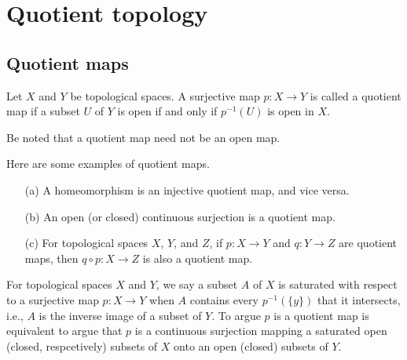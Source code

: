 \section{Quotient topology}

\subsection{Quotient maps}

\begin{defi}
    Let $X$ and $Y$ be topological spaces.
    A surjective map $p: X\rightarrow Y$ is called a quotient map if a subset $U$ of $Y$ is open if and only if $p^{-1}(U)$ is open in $X$.
\end{defi}
\begin{rmk}
    Be noted that a quotient map need not be an open map.
\end{rmk}
\begin{exmp}
    Here are some examples of quotient maps.
    \begin{enumerate}
        \item[(a)]
        {
            A homeomorphism is an injective quotient map, and vice versa.
        }
        \item[(b)]
        {
            An open (or closed) continuous surjection is a quotient map.
        }
        \item[(c)]
        {
            For topological spaces $X$, $Y$, and $Z$, if $p: X\rightarrow Y$ and $q: Y\rightarrow Z$ are quotient maps, then $q\circ p: X\rightarrow Z$ is also a quotient map.
        }
    \end{enumerate}
\end{exmp}

For topological spaces $X$ and $Y$, we say a subset $A$ of $X$ is saturated with respect to a surjective map $p: X\rightarrow Y$ when $A$ contains every $p^{-1}(\{y\})$ that it intersects, i.e., $A$ is the inverse image of a subset of $Y$.
To argue $p$ is a quotient map is equivalent to argue that $p$ is a continuous surjection mapping a saturated open (closed, respcetively) subsets of $X$ onto an open (closed) subsets of $Y$.


